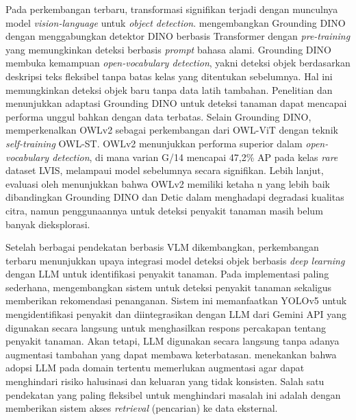 Pada perkembangan terbaru, transformasi signifikan terjadi dengan munculnya model \textit{vision-language} untuk \textit{object detection}. \textcite{liuGroundingDINOMarrying2025} mengembangkan Grounding DINO dengan menggabungkan detektor DINO berbasis Transformer dengan \textit{pre-training} yang memungkinkan deteksi berbasis \textit{prompt} bahasa alami. Grounding DINO membuka kemampuan \textit{open-vocabulary detection}, yakni deteksi objek berdasarkan deskripsi teks fleksibel tanpa batas kelas yang ditentukan sebelumnya. Hal ini memungkinkan deteksi objek baru tanpa data latih tambahan. Penelitian \textcite{singhFarmerChatScalingAIPowered2024} dan \textcite{weiBenchmarkingInthewildMultimodal2024} menunjukkan adaptasi Grounding DINO untuk deteksi tanaman dapat mencapai performa unggul bahkan dengan data terbatas. Selain Grounding DINO, \textcite{mindererScalingOpenVocabularyObject2024} memperkenalkan OWLv2 sebagai perkembangan dari OWL-ViT dengan teknik \textit{self-training} OWL-ST. OWLv2 menunjukkan performa superior dalam \textit{open-vocabulary detection}, di mana varian G/14 mencapai 47,2\% AP pada kelas \textit{rare} dataset LVIS, melampaui model sebelumnya secara signifikan. Lebih lanjut, evaluasi oleh \textcite{wuEvaluatingPerformanceOpenVocabulary2026} menunjukkan bahwa OWLv2 memiliki ketaha n yang lebih baik dibandingkan Grounding DINO dan Detic dalam menghadapi degradasi kualitas citra, namun penggunaannya untuk deteksi penyakit tanaman masih belum banyak dieksplorasi.

Setelah berbagai pendekatan berbasis VLM dikembangkan, perkembangan terbaru menunjukkan upaya integrasi model deteksi objek berbasis \textit{deep learning} dengan LLM untuk identifikasi penyakit tanaman. Pada implementasi paling sederhana, \textcite{sbDesignImplementationAIPowered2024} mengembangkan sistem untuk deteksi penyakit tanaman sekaligus memberikan rekomendasi penanganan. Sistem ini memanfaatkan YOLOv5 untuk mengidentifikasi penyakit dan diintegrasikan dengan LLM dari Gemini API yang digunakan secara langsung untuk menghasilkan respons percakapan tentang penyakit tanaman. Akan tetapi, LLM digunakan secara langsung tanpa adanya augmentasi tambahan yang dapat membawa keterbatasan. \textcite{minaeeLargeLanguageModels2025} menekankan bahwa adopsi LLM pada domain tertentu memerlukan augmentasi agar dapat menghindari risiko halusinasi dan keluaran yang tidak konsisten. Salah satu pendekatan yang paling fleksibel untuk menghindari masalah ini adalah dengan memberikan sistem akses \textit{retrieval} (pencarian) ke data eksternal.

